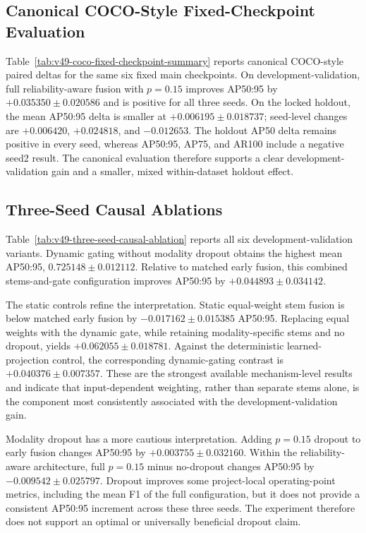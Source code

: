 

\subsection{Canonical COCO-Style Fixed-Checkpoint Evaluation}

Table~\ref{tab:v49-coco-fixed-checkpoint-summary} reports canonical COCO-style paired deltas for the same six fixed main checkpoints. On development-validation, full reliability-aware fusion with $p=0.15$ improves AP50:95 by $+0.035350\pm0.020586$ and is positive for all three seeds. On the locked holdout, the mean AP50:95 delta is smaller at $+0.006195\pm0.018737$; seed-level changes are $+0.006420$, $+0.024818$, and $-0.012653$. The holdout AP50 delta remains positive in every seed, whereas AP50:95, AP75, and AR100 include a negative seed2 result. The canonical evaluation therefore supports a clear development-validation gain and a smaller, mixed within-dataset holdout effect.



\subsection{Three-Seed Causal Ablations}

Table~\ref{tab:v49-three-seed-causal-ablation} reports all six development-validation variants. Dynamic gating without modality dropout obtains the highest mean AP50:95, $0.725148\pm0.012112$. Relative to matched early fusion, this combined stems-and-gate configuration improves AP50:95 by $+0.044893\pm0.034142$.

The static controls refine the interpretation. Static equal-weight stem fusion is below matched early fusion by $-0.017162\pm0.015385$ AP50:95. Replacing equal weights with the dynamic gate, while retaining modality-specific stems and no dropout, yields $+0.062055\pm0.018781$. Against the deterministic learned-projection control, the corresponding dynamic-gating contrast is $+0.040376\pm0.007357$. These are the strongest available mechanism-level results and indicate that input-dependent weighting, rather than separate stems alone, is the component most consistently associated with the development-validation gain.

Modality dropout has a more cautious interpretation. Adding $p=0.15$ dropout to early fusion changes AP50:95 by $+0.003755\pm0.032160$. Within the reliability-aware architecture, full $p=0.15$ minus no-dropout changes AP50:95 by $-0.009542\pm0.025797$. Dropout improves some project-local operating-point metrics, including the mean F1 of the full configuration, but it does not provide a consistent AP50:95 increment across these three seeds. The experiment therefore does not support an optimal or universally beneficial dropout claim.

